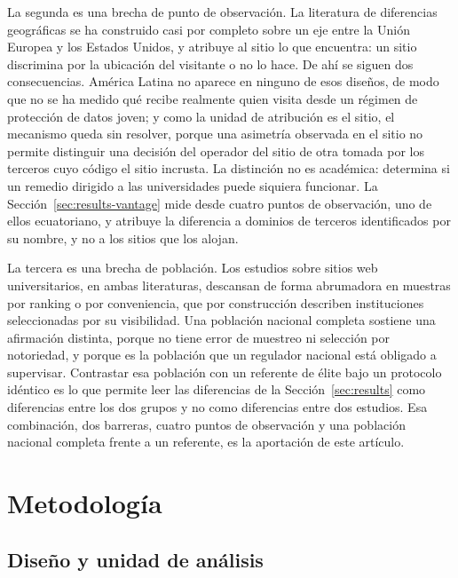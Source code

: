 \documentclass[pdflatex,sn-basic,Numbered]{sn-jnl}
\theoremstyle{thmstyleone}
\theoremstyle{thmstyletwo}
\theoremstyle{thmstylethree}
\begin{document}
La segunda es una brecha de punto de observaci\'on. La literatura de diferencias geogr\'aficas se ha construido casi por completo sobre un eje entre la Uni\'on Europea y los Estados Unidos, y atribuye al sitio lo que encuentra: un sitio discrimina por la ubicaci\'on del visitante o no lo hace. De ah\'i se siguen dos consecuencias. Am\'erica Latina no aparece en ninguno de esos dise\~nos, de modo que no se ha medido qu\'e recibe realmente quien visita desde un r\'egimen de protecci\'on de datos joven; y como la unidad de atribuci\'on es el sitio, el mecanismo queda sin resolver, porque una asimetr\'ia observada en el sitio no permite distinguir una decisi\'on del operador del sitio de otra tomada por los terceros cuyo c\'odigo el sitio incrusta. La distinci\'on no es acad\'emica: determina si un remedio dirigido a las universidades puede siquiera funcionar. La Secci\'on~\ref{sec:results-vantage} mide desde cuatro puntos de observaci\'on, uno de ellos ecuatoriano, y atribuye la diferencia a dominios de terceros identificados por su nombre, y no a los sitios que los alojan.

La tercera es una brecha de poblaci\'on. Los estudios sobre sitios web universitarios, en ambas literaturas, descansan de forma abrumadora en muestras por ranking o por conveniencia, que por construcci\'on describen instituciones seleccionadas por su visibilidad. Una poblaci\'on nacional completa sostiene una afirmaci\'on distinta, porque no tiene error de muestreo ni selecci\'on por notoriedad, y porque es la poblaci\'on que un regulador nacional est\'a obligado a supervisar. Contrastar esa poblaci\'on con un referente de \'elite bajo un protocolo id\'entico es lo que permite leer las diferencias de la Secci\'on~\ref{sec:results} como diferencias entre los dos grupos y no como diferencias entre dos estudios. Esa combinaci\'on, dos barreras, cuatro puntos de observaci\'on y una poblaci\'on nacional completa frente a un referente, es la aportaci\'on de este art\'iculo.

\section{Metodolog\'ia}\label{sec:methods}

\subsection{Dise\~no y unidad de an\'alisis}\label{sec:methods-design}
\end{document}
